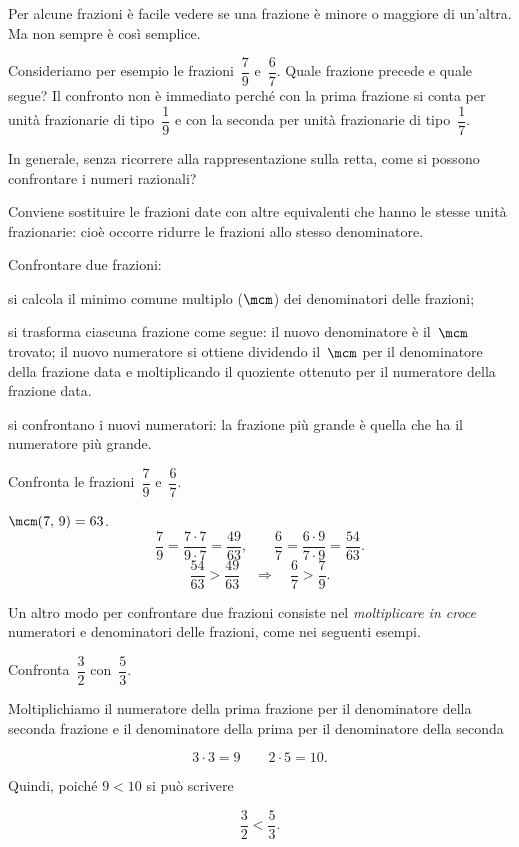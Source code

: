 Per alcune frazioni è facile vedere se una frazione è minore o maggiore di un'altra. Ma non sempre è così semplice.

Consideriamo per esempio le frazioni~$\dfrac{7}{9}$ e~$\dfrac{6}{7}$.
Quale frazione precede e quale segue? Il confronto non è immediato perché con la prima frazione si conta per
unità frazionarie di tipo~$\dfrac{1}{9}$ e con la seconda per unità frazionarie di tipo~$\dfrac{1}{7}$.

In generale, senza ricorrere alla rappresentazione sulla retta, come si possono confrontare i numeri razionali?

Conviene sostituire le frazioni date con altre equivalenti che hanno le stesse unità frazionarie:
cioè occorre ridurre le frazioni allo stesso denominatore.

\begin{procedura}
	Confrontare due frazioni:
\begin{enumeratea}
\item si calcola il minimo comune multiplo ($\mcm$) dei denominatori delle frazioni;
\item si trasforma ciascuna frazione come segue:
\subitem il nuovo denominatore è il~$\mcm$ trovato;
\subitem il nuovo numeratore si ottiene dividendo il~$\mcm$ per il denominatore della
	  frazione data e moltiplicando il quoziente ottenuto per il numeratore della frazione data.
\item si confrontano i nuovi numeratori: la frazione più grande è quella che ha il numeratore più
	grande.
\end{enumeratea}
\end{procedura}

\begin{exrig}
\begin{esempio}
Confronta le frazioni~$\dfrac{7}{9}$ e~$\dfrac{6}{7}$.

$\mcm(7\text{,~}9)=63$.
\[\frac{7}{9}=\frac{7\cdot7}{9\cdot7}=\frac{49}{63}\text{,}\qquad%
\frac{6}{7}=\frac{6\cdot9}{7\cdot9}=\frac{54}{63}.\]
\[\frac{54}{63}>\frac{49}{63}\quad\Rightarrow\quad\frac{6}{7}>\frac{7}{9}.\]
\end{esempio}
\end{exrig}

Un altro modo per confrontare due frazioni consiste nel \emph{moltiplicare in croce} numeratori e
denominatori delle frazioni, come nei seguenti esempi.

\pagebreak
\begin{exrig}
\begin{esempio}
Confronta~$\dfrac{3}{2}$ con~$\dfrac{5}{3}$.

Moltiplichiamo il numeratore della prima frazione per il denominatore della seconda frazione e
il denominatore della prima per il denominatore della seconda

 \[3\cdot3=9 \qquad 2\cdot5=10.\]

Quindi, poiché $9<10$ si può scrivere

 \[\dfrac{3}{2}<\dfrac{5}{3}.\]

\end{esempio}
\end{exrig}

